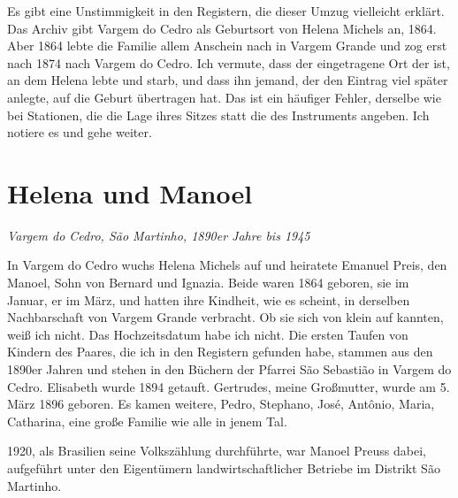 \documentclass[
  ngerman,
  11pt,
  openany]{book}
\begin{document}
Es gibt eine Unstimmigkeit in den Registern, die dieser Umzug vielleicht
erklärt. Das Archiv gibt Vargem do Cedro als Geburtsort von Helena
Michels an, 1864. Aber 1864 lebte die Familie allem Anschein nach in
Vargem Grande und zog erst nach 1874 nach Vargem do Cedro. Ich vermute,
dass der eingetragene Ort der ist, an dem Helena lebte und starb, und
dass ihn jemand, der den Eintrag viel später anlegte, auf die Geburt
übertragen hat. Das ist ein häufiger Fehler, derselbe wie bei Stationen,
die die Lage ihres Sitzes statt die des Instruments angeben. Ich notiere
es und gehe weiter.

\section{Helena und Manoel}\label{helena-und-manoel}

\emph{Vargem do Cedro, São Martinho, 1890er Jahre bis 1945}

In Vargem do Cedro wuchs Helena Michels auf und heiratete Emanuel Preis,
den Manoel, Sohn von Bernard und Ignazia. Beide waren 1864 geboren, sie
im Januar, er im März, und hatten ihre Kindheit, wie es scheint, in
derselben Nachbarschaft von Vargem Grande verbracht. Ob sie sich von
klein auf kannten, weiß ich nicht. Das Hochzeitsdatum habe ich nicht.
Die ersten Taufen von Kindern des Paares, die ich in den Registern
gefunden habe, stammen aus den 1890er Jahren und stehen in den Büchern
der Pfarrei São Sebastião in Vargem do Cedro. Elisabeth wurde 1894
getauft. Gertrudes, meine Großmutter, wurde am 5. März 1896 geboren. Es
kamen weitere, Pedro, Stephano, José, Antônio, Maria, Catharina, eine
große Familie wie alle in jenem Tal.

1920, als Brasilien seine Volkszählung durchführte, war Manoel Preuss
dabei, aufgeführt unter den Eigentümern landwirtschaftlicher Betriebe im
Distrikt São Martinho.
\end{document}
